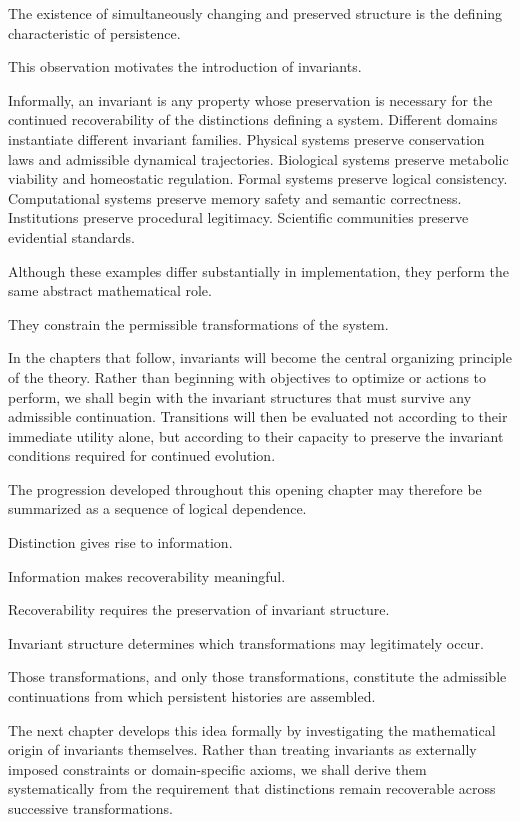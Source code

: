 \documentclass[11pt]{book}
\numberwithin{equation}{chapter}
\theoremstyle{definition}
\theoremstyle{plain}
\begin{document}
The existence of simultaneously changing and preserved structure is the defining characteristic of persistence.

This observation motivates the introduction of invariants.

Informally, an invariant is any property whose preservation is necessary for the continued recoverability of the distinctions defining a system. Different domains instantiate different invariant families. Physical systems preserve conservation laws and admissible dynamical trajectories. Biological systems preserve metabolic viability and homeostatic regulation. Formal systems preserve logical consistency. Computational systems preserve memory safety and semantic correctness. Institutions preserve procedural legitimacy. Scientific communities preserve evidential standards.

Although these examples differ substantially in implementation, they perform the same abstract mathematical role.

They constrain the permissible transformations of the system.

In the chapters that follow, invariants will become the central organizing principle of the theory. Rather than beginning with objectives to optimize or actions to perform, we shall begin with the invariant structures that must survive any admissible continuation. Transitions will then be evaluated not according to their immediate utility alone, but according to their capacity to preserve the invariant conditions required for continued evolution.

The progression developed throughout this opening chapter may therefore be summarized as a sequence of logical dependence.

Distinction gives rise to information.

Information makes recoverability meaningful.

Recoverability requires the preservation of invariant structure.

Invariant structure determines which transformations may legitimately occur.

Those transformations, and only those transformations, constitute the admissible continuations from which persistent histories are assembled.

The next chapter develops this idea formally by investigating the mathematical origin of invariants themselves. Rather than treating invariants as externally imposed constraints or domain-specific axioms, we shall derive them systematically from the requirement that distinctions remain recoverable across successive transformations.
\end{document}
